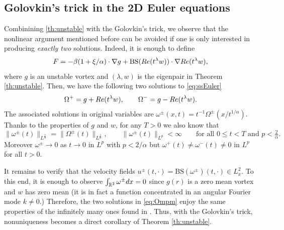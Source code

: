 \documentclass[11pt,reqno]{amsproc}
\def\dd{{\rm d}}
\def\RR {\mathbb{R}}
\def\Re{{\rm Re}}
\theoremstyle{definition}
\theoremstyle{definition}
\numberwithin{equation}{section}
\begin{document}
\subsection{Golovkin's trick in the 2D Euler equations}
\label{sec:golovkin_euler}
Combinining \cref{th:unstable} with the Golovkin's trick, we observe that the nonlinear argument mentioned before can be avoided if one is only interested in producing \emph{exactly two} solutions.
Indeed, it is enough to define 
\begin{equation}
\label{def:FG}
    F=-\beta(1+\xi/\alpha)\cdot \nabla g+\mathrm{BS}(\Re(t^\lambda w))\cdot \nabla \Re(t^\lambda w),
\end{equation}
where $g$ is an unstable vortex and $(\lambda,w)$ is the eigenpair in Theorem \ref{th:unstable}. Then, we have the following two solutions to \cref{eq:ssEuler}
\begin{equation}
\label{eq:Ompm}
    \Omega^+=g+\Re(t^\lambda w), \qquad \Omega^-=g-\Re(t^\lambda w).
\end{equation}
The associated solutions in original variables are $\omega^\pm(x,t)=t^{-1}\Omega^\pm(x/t^{1/\alpha})$. Thanks to the properties of $g$ and $w$, for any $T>0$ we also know that 
\begin{equation}
    \|\omega^\pm(t)\|_{L^{\frac{2}{\alpha}}}=\|\Omega^\pm(t)\|_{L^{\frac{2}{\alpha}}}, \qquad  \|\omega^\pm(t)\|_{L^p}<\infty \qquad \text{for all } 0\leq t<T \text{ and } p<\tfrac{2}{\alpha}.
\end{equation}
Moreover $\omega^\pm \to 0$ as $t\to 0$ in $L^p$ with $p<2/\alpha$ but $\omega^+(t)\neq\omega^{-}(t) \neq 0$ in $L^p$ for all $t>0.$

It remains to verify that the velocity fields $u^{\pm}(t,\cdot)=\mathrm{BS}(\omega^{\pm})(t,\cdot)\in L^2_x$. To this end, it is enough to observe $\int_{\RR^2}\omega^\pm \dd x=0$ since $g(r)$ is a zero mean vortex and $w$ has zero mean (it is in fact a function concentrated in an angular Fourier mode $k\neq 0$.)
Therefore, the two solutions in \cref{eq:Ompm} enjoy the same properties of the infinitely many ones found in \cite{vishik2018instability1,vishik2018instability2,vishik_notes,castro2024proof}. Thus,  with the Golovkin's trick, nonuniqueness becomes a direct corollary of Theorem \ref{th:unstable}.
\end{document}
